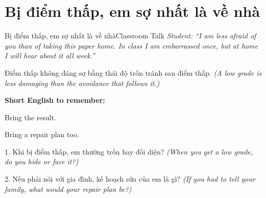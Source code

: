 \section{Bị điểm thấp, em sợ nhất là về nhà}
\begin{truyen}{Bị điểm thấp, em sợ nhất là về nhà}{Classroom Talk}
\textit{Student: ``I am less afraid of you than of taking this paper home. In class I am embarrassed once, but at home I will hear about it all week.''}\\[4pt]



\end{truyen}

\begin{baihoc}
Điểm thấp không đáng sợ bằng thái độ trốn tránh sau điểm thấp.
\textit{(A low grade is less damaging than the avoidance that follows it.)}
\end{baihoc}

\begin{ghinhoanh}
\textbf{Short English to remember:}

Bring the result.

Bring a repair plan too.
\end{ghinhoanh}

\begin{tuhocnhanh}
1. Khi bị điểm thấp, em thường trốn hay đối diện? \textit{(When you get a low grade, do you hide or face it?)}

2. Nếu phải nói với gia đình, kế hoạch sửa của em là gì? \textit{(If you had to tell your family, what would your repair plan be?)}
\end{tuhocnhanh}
\ngancach